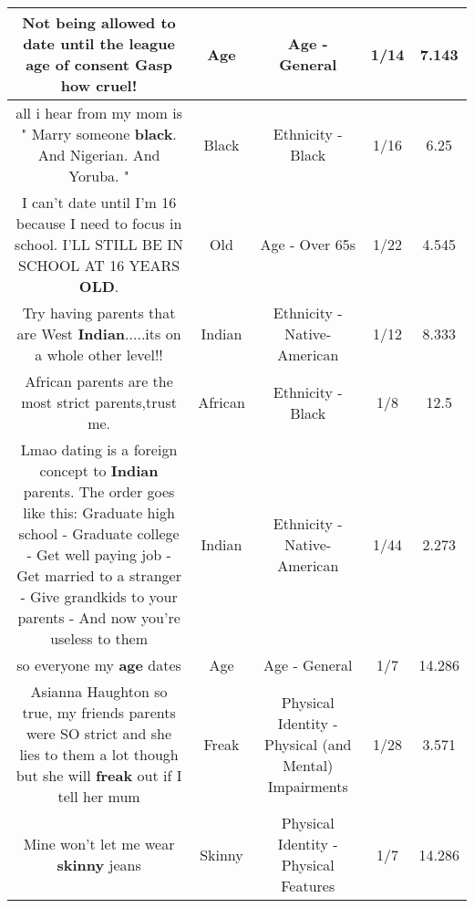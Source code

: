 \documentclass[11pt]{article}
\newlength\mylength
\begin{document}
\begin{center}
\begin{longtable}{|C{.65\mylength}|C{.30\mylength}|C{.12\mylength}|C{.12\mylength}|C{.12\mylength}|}
  \small Not being allowed to date until the league \textbf{age} of consent Gasp how cruel!\normalsize   & Age & Age - General & 1/14 & 7.143 \\  \hline
  \small all i hear from my mom is " Marry someone \textbf{black}. And Nigerian. And Yoruba. "\normalsize   & Black & Ethnicity - Black & 1/16 & 6.25 \\  \hline
  \small I can't date until I'm 16 because I need to focus in school. I'LL STILL BE IN SCHOOL AT 16 YEARS \textbf{OLD}.\normalsize   & Old & Age - Over 65s & 1/22 & 4.545 \\  \hline
  \small Try having parents that are West \textbf{Indian}.....its on a whole other level!!\normalsize   & Indian & Ethnicity - Native-American & 1/12 & 8.333 \\  \hline
  \small African parents are the most strict parents,trust me.\normalsize   & African & Ethnicity - Black & 1/8 & 12.5 \\  \hline
  \small Lmao dating is a foreign concept to \textbf{Indian} parents. The order goes like this: Graduate high school - Graduate college - Get well paying job - Get married to a stranger - Give grandkids to your parents - And now you're useless to them\normalsize   & Indian & Ethnicity - Native-American & 1/44 & 2.273 \\  \hline
  \small {} so everyone my \textbf{age} dates\normalsize   & Age & Age - General & 1/7 & 14.286 \\  \hline
  \small Asianna Haughton so true, my friends parents were SO strict and she lies to them a lot though but she will \textbf{freak} out if I tell her mum\normalsize   & Freak & Physical Identity - Physical (and Mental) Impairments & 1/28 & 3.571 \\  \hline
  \small Mine won't let me wear \textbf{skinny} jeans\normalsize   & Skinny & Physical Identity - Physical Features & 1/7 & 14.286 \\  \hline

\end{longtable}
\end{center}
\end{document}
